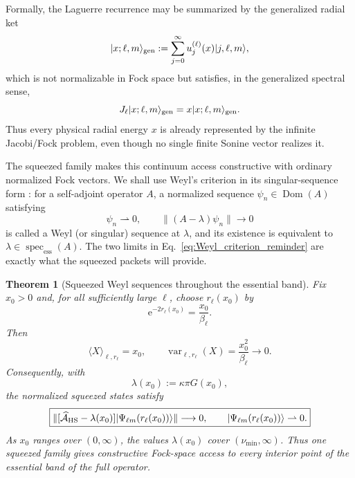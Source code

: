 \documentclass[11pt]{article}
\numberwithin{equation}{section}
\newcommand{\Dom}{\operatorname{Dom}}
\newcommand{\specess}{\operatorname{spec}_{\mathrm{ess}}}
\newcommand{\e}{\mathrm e}
\newtheorem{theorem}{Theorem}[section]
\theoremstyle{definition}
\begin{document}
Formally, the Laguerre recurrence may be summarized by the generalized radial
ket
\begin{equation}
 |x;\ell,m\rangle_{\rm gen}
 :=\sum_{j=0}^\infty
 u_j^{(\ell)}(x)|j,\ell,m\rangle,
 \label{eq:generalized_J_eigenket}
\end{equation}
which is not normalizable in Fock space but satisfies, in the generalized
spectral sense,
\begin{equation}
 J_\ell|x;\ell,m\rangle_{\rm gen}
 =x|x;\ell,m\rangle_{\rm gen}.
\end{equation}
Thus every physical radial energy $x$ is already represented by the infinite
Jacobi/Fock problem, even though no single finite Sonine vector realizes it.

The squeezed family makes this continuum access constructive with ordinary
normalized Fock vectors.  We shall use Weyl's criterion in its singular-sequence
form \cite{ReedSimon1980}: for a self-adjoint operator $A$, a normalized sequence
$\psi_n\in\Dom(A)$ satisfying
\begin{equation}
 \psi_n\rightharpoonup0,
 \qquad
 \|(A-\lambda)\psi_n\|\longrightarrow0
 \label{eq:Weyl_criterion_reminder}
\end{equation}
is called a Weyl (or singular) sequence at $\lambda$, and its existence is
equivalent to $\lambda\in\specess(A)$.  The two limits in
Eq.~\eqref{eq:Weyl_criterion_reminder} are exactly what the squeezed packets
will provide.

\begin{theorem}[Squeezed Weyl sequences throughout the essential band]
Fix $x_0>0$ and, for all sufficiently large $\ell$, choose $r_\ell(x_0)$ by
\begin{equation}
 \e^{-2r_\ell(x_0)}=\frac{x_0}{\beta_\ell}.
 \label{eq:continuum_squeeze_choice}
\end{equation}
Then
\begin{equation}
 \langle X\rangle_{\ell,r_\ell}=x_0,
 \qquad
 \operatorname{var}_{\ell,r_\ell}(X)
 =\frac{x_0^2}{\beta_\ell}\longrightarrow0.
 \label{eq:continuum_X_concentration}
\end{equation}
Consequently, with
\begin{equation}
 \lambda(x_0):=\kappa\pi G(x_0),
\end{equation}
the normalized squeezed states satisfy
\begin{equation}
 \boxed{
 \|[\widehat{\mathcal A}_{\rm HS}-\lambda(x_0)]
 |\Psi_{\ell m}(r_\ell(x_0))\rangle\|
 \longrightarrow0,
 \qquad
 |\Psi_{\ell m}(r_\ell(x_0))\rangle\rightharpoonup0.
 }
 \label{eq:full_continuum_Weyl}
\end{equation}
As $x_0$ ranges over $(0,\infty)$, the values $\lambda(x_0)$ cover
$(\nu_{\min},\infty)$.  Thus one squeezed family gives constructive Fock-space
access to every interior point of the essential band of the full operator.
\end{theorem}
\end{document}
